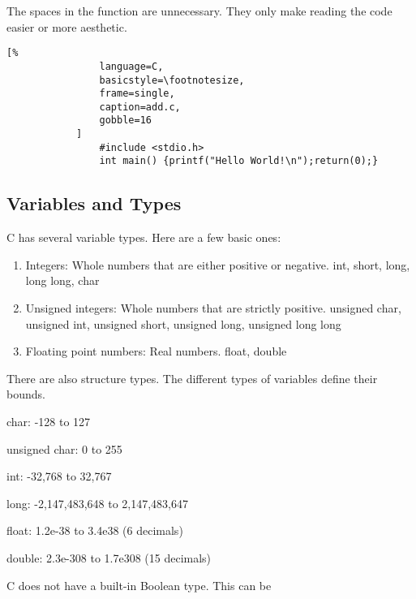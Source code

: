 \documentclass[crop=false,class=book]{standalone}
\begin{document}
            \newline
            The spaces in the function are unnecessary.
            They only make reading the code easier or more aesthetic.
            \begin{lstlisting}[%
                language=C,
                basicstyle=\footnotesize,
                frame=single,
                caption=add.c,
                gobble=16
            ]
                #include <stdio.h>
                int main() {printf("Hello World!\n");return(0);}
            \end{lstlisting}
        \subsection{Variables and Types}
            C has several variable types. Here are a few basic ones:
            \begin{enumerate}
                \item Integers: Whole numbers that are either
                    positive or negative. int, short, long,
                    long long, char
                \item Unsigned integers: Whole numbers that are
                    strictly positive. unsigned char,
                    unsigned int, unsigned short, unsigned long,
                    unsigned long long
                \item Floating point numbers: Real numbers.
                    float, double
            \end{enumerate}
            There are also structure types. The different types of
            variables define their bounds.
            \begin{itemize}
                \begin{multicols}{2}
                    \item char: -128 to 127
                    \item unsigned char: 0 to 255
                    \item int: -32,768 to 32,767
                    \item long: -2,147,483,648 to 2,147,483,647
                    \item float: 1.2e-38 to 3.4e38 (6 decimals)
                    \item double: 2.3e-308 to 1.7e308 (15 decimals)
                \end{multicols}
            \end{itemize}
            C does not have a built-in Boolean type. This can be
\end{document}
